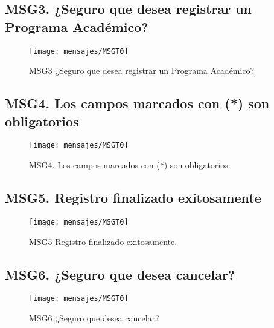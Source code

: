 \subsection{MSG3. ¿Seguro que desea registrar un Programa Académico?}
    \begin{figure}[htbp]
        \begin{center}
            \texttt{[image: mensajes/MSGT0]}
            \caption{MSG3 ¿Seguro que desea registrar un Programa Académico?}
            \label{fig:MSG3}
        \end{center}
    \end{figure}

\subsection{MSG4. Los campos marcados con (*) son obligatorios}
    \begin{figure}[htbp]
        \begin{center}
            \texttt{[image: mensajes/MSGT0]}
            \caption{MSG4. Los campos marcados con (*) son obligatorios.}
            \label{fig:MSG4}
        \end{center}
    \end{figure}

\subsection{MSG5. Registro finalizado exitosamente}
    \begin{figure}[htbp]
        \begin{center}
            \texttt{[image: mensajes/MSGT0]}
            \caption{MSG5 Registro finalizado exitosamente.}
            \label{fig:MSG5}
        \end{center}
    \end{figure}

\subsection{MSG6. ¿Seguro que desea cancelar?}
    \begin{figure}[htbp]
        \begin{center}
            \texttt{[image: mensajes/MSGT0]}
            \caption{MSG6 ¿Seguro que desea cancelar?}
            \label{fig:MSG6}
        \end{center}
    \end{figure}

